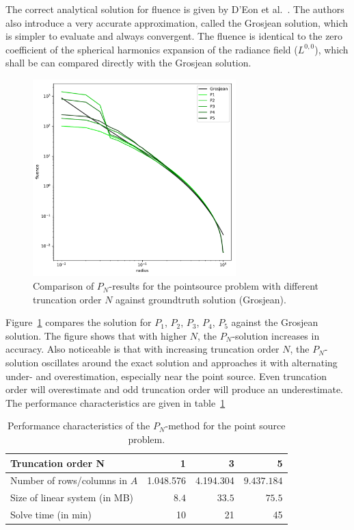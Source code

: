 The correct analytical solution for fluence is given by D'Eon et al.~\cite{dEon11}. The authors also introduce a very accurate approximation, called the Grosjean solution, which is simpler to evaluate and always convergent. The fluence is identical to the zero coefficient of the spherical harmonics expansion of the radiance field ($L^{0,0}$), which shall be can compared directly with the Grosjean solution.
\begin{figure}[h]
\centering
\includegraphics[width=0.7\textwidth]{04_pn_method/results/pointsource_pn.pdf}
\caption{Comparison of $P_N$-results for the pointsource problem with different truncation order $N$ against groundtruth solution (Grosjean).}
\label{fig:pn_results_pointsource_1}
\end{figure}
Figure~\ref{fig:pn_results_pointsource_1} compares the solution for $P_1$, $P_2$, $P_3$, $P_4$, $P_5$ against the Grosjean solution. The figure shows that with higher $N$, the $P_N$-solution increases in accuracy. Also noticeable is that with increasing truncation order $N$, the $P_N$-solution oscillates around the exact solution and approaches it with alternating under- and overestimation, especially near the point source. Even truncation order will overestimate and odd truncation order will produce an underestimate. The performance characteristics are given in table~\ref{tab:results_pointsource}

\begin{table}[!h]
	\centering
	\caption{Performance characteristics of the $P_N$-method for the point source problem.}
	\label{tab:results_pointsource}
	\begin{tabular}{l r r r}
    \hline
	Truncation order \textbf{N}
    & 1 & 3 & 5
    \\
    \hline
    Number of rows/columns in $A$
    & 1.048.576 & 4.194.304 & $9.437.184$
    \\
    Size of linear system (in MB)
    & $8.4$ & $33.5$ & $75.5$
    \\
    Solve time (in min)
    & 10 & 21 & 45
	\end{tabular}
\end{table}

